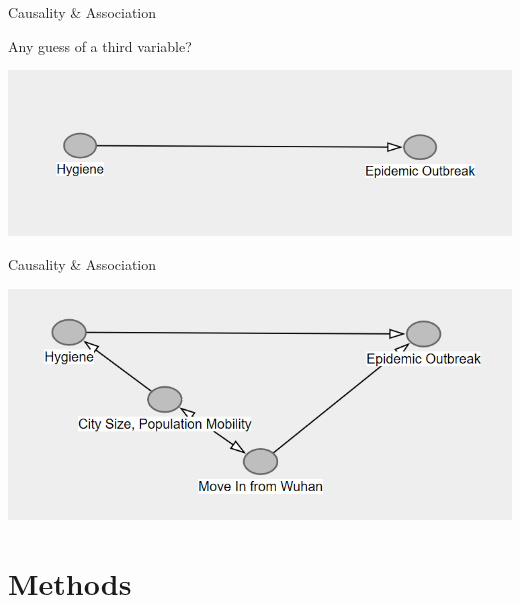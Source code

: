\documentclass[10pt,ignorenonframetext,aspectratio=169,notes=hide,]{beamer}
\begin{document}
\begin{frame}{Causality \& Association}
\protect\hypertarget{causality-association-1}{}

Any guess of a third variable?

\includegraphics[width=1\linewidth]{image/p1c}

\end{frame}

\begin{frame}{Causality \& Association}
\protect\hypertarget{causality-association-2}{}

\includegraphics[width=1\linewidth]{image/p2}

\end{frame}

\hypertarget{methods}{%
\section{Methods}\label{methods}}
\end{document}

